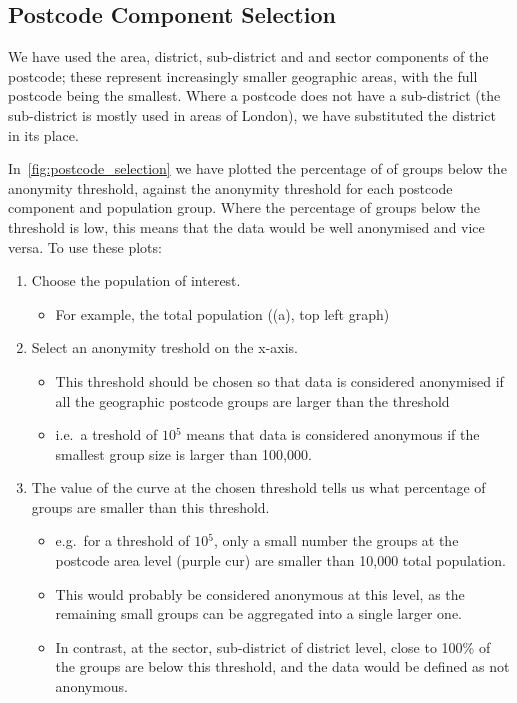 \documentclass[12pt, a4paper]{article}
\begin{document}
\subsection{Postcode Component Selection}

We have used the area, district, sub-district and and sector components of the postcode; these represent increasingly smaller geographic areas, with the full postcode being the smallest. Where a postcode does not have a sub-district (the sub-district is mostly used in areas of London), we have substituted the district in its place.

In~\cref{fig:postcode_selection} we have plotted the percentage of of groups below the anonymity threshold, against the anonymity threshold for each postcode component and population group. Where the percentage of groups below the threshold is low, this means that the data would be well anonymised and vice versa. To use these plots:
\begin{enumerate}
\item Choose the population of interest.
\begin{itemize}
\item For example, the total population ((a), top left graph)
\end{itemize}
\item Select an anonymity treshold on the x-axis. 
\begin{itemize}
\item This threshold should be chosen so that data is considered anonymised if all the geographic postcode groups are larger than the threshold
\item i.e.\ a treshold of $10{^5}$ means that data is considered anonymous if the smallest group size is larger than 100,000.
\end{itemize}
\item The value of the curve at the chosen threshold tells us what percentage of groups are smaller than this threshold.
\begin{itemize}
\item e.g.\ for a threshold of $10{^5}$, only a small number the groups at the postcode area level (purple cur) are smaller than 10,000 total population.
\item This would probably be considered anonymous at this level, as the remaining small groups can be aggregated into a single larger one.
\item In contrast, at the sector, sub-district of district level, close to 100\% of the groups are below this threshold, and the data would be defined as not anonymous.
\end{itemize}
\end{enumerate}
\end{document}
